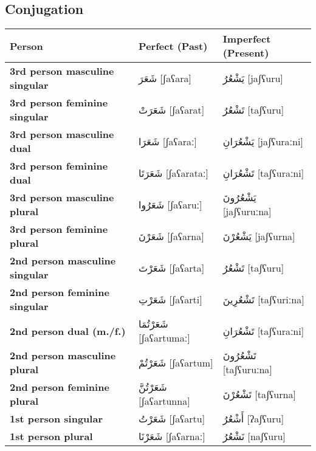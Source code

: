 \documentclass[letter,12pt]{article}
\begin{document}
\subsection{Conjugation}
\begin{longtable}{|>{\raggedright}p{3.5cm}|p{5cm}|p{5cm}|}
\hline
\textbf{Person} & \textbf{Perfect (Past)} & \textbf{Imperfect (Present)} \\
\hline
\textbf{3rd person masculine singular} & \textarabic{شَعَرَ} [ʃaʕara] & \textarabic{يَشْعُرُ} [jaʃʕuru] \\
\hline
\textbf{3rd person feminine singular} & \textarabic{شَعَرَتْ} [ʃaʕarat] & \textarabic{تَشْعُرُ} [taʃʕuru] \\
\hline
\textbf{3rd person masculine dual} & \textarabic{شَعَرَا} [ʃaʕaraː] & \textarabic{يَشْعُرَانِ} [jaʃʕuraːni] \\
\hline
\textbf{3rd person feminine dual} & \textarabic{شَعَرَتَا} [ʃaʕarataː] & \textarabic{تَشْعُرَانِ} [taʃʕuraːni] \\
\hline
\textbf{3rd person masculine plural} & \textarabic{شَعَرُوا} [ʃaʕaruː] & \textarabic{يَشْعُرُونَ} [jaʃʕuruːna] \\
\hline
\textbf{3rd person feminine plural} & \textarabic{شَعَرْنَ} [ʃaʕarna] & \textarabic{يَشْعُرْنَ} [jaʃʕurna] \\
\hline
\textbf{2nd person masculine singular} & \textarabic{شَعَرْتَ} [ʃaʕarta] & \textarabic{تَشْعُرُ} [taʃʕuru] \\
\hline
\textbf{2nd person feminine singular} & \textarabic{شَعَرْتِ} [ʃaʕarti] & \textarabic{تَشْعُرِينَ} [taʃʕuriːna] \\
\hline
\textbf{2nd person dual (m./f.)} & \textarabic{شَعَرْتُمَا} [ʃaʕartumaː] & \textarabic{تَشْعُرَانِ} [taʃʕuraːni] \\
\hline
\textbf{2nd person masculine plural} & \textarabic{شَعَرْتُمْ} [ʃaʕartum] & \textarabic{تَشْعُرُونَ} [taʃʕuruːna] \\
\hline
\textbf{2nd person feminine plural} & \textarabic{شَعَرْتُنَّ} [ʃaʕartunna] & \textarabic{تَشْعُرْنَ} [taʃʕurna] \\
\hline
\textbf{1st person singular} & \textarabic{شَعَرْتُ} [ʃaʕartu] & \textarabic{أَشْعُرُ} [ʔaʃʕuru] \\
\hline
\textbf{1st person plural} & \textarabic{شَعَرْنَا} [ʃaʕarnaː] & \textarabic{نَشْعُرُ} [naʃʕuru] \\
\hline
\end{longtable}
\end{document}
